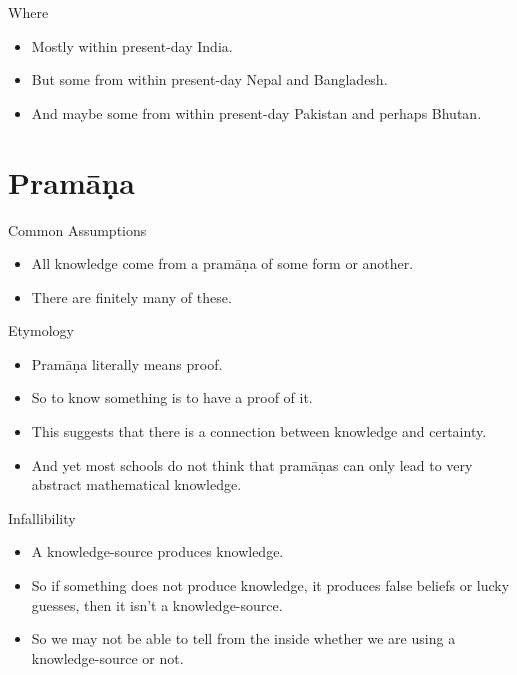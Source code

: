 \documentclass[
  17pt,
  letterpaper,
  ignorenonframetext,
  aspectratio=169,
  handout]{beamer}
\providecommand{\tightlist}{%
  \setlength{\itemsep}{0pt}\setlength{\parskip}{0pt}}\usepackage{longtable,booktabs,array}
\begin{document}
\begin{frame}{Where}
\protect\hypertarget{where-1}{}
\begin{itemize}[<+->]
\tightlist
\item
  Mostly within present-day India.
\item
  But some from within present-day Nepal and Bangladesh.
\item
  And maybe some from within present-day Pakistan and perhaps Bhutan.
\end{itemize}
\end{frame}

\hypertarget{pramux101ux1e47a}{%
\section{Pramāṇa}\label{pramux101ux1e47a}}

\begin{frame}{Common Assumptions}
\protect\hypertarget{common-assumptions}{}
\begin{itemize}[<+->]
\tightlist
\item
  All knowledge come from a pramāṇa of some form or another.
\item
  There are finitely many of these.
\end{itemize}
\end{frame}

\begin{frame}{Etymology}
\protect\hypertarget{etymology}{}
\begin{itemize}[<+->]
\tightlist
\item
  Pramāṇa literally means proof.
\item
  So to know something is to have a proof of it.
\item
  This suggests that there is a connection between knowledge and
  certainty.
\item
  And yet most schools do not think that pramāṇas can only lead to very
  abstract mathematical knowledge.
\end{itemize}
\end{frame}

\begin{frame}{Infallibility}
\protect\hypertarget{infallibility}{}
\begin{itemize}[<+->]
\tightlist
\item
  A knowledge-source produces knowledge.
\item
  So if something does not produce knowledge, it produces false beliefs
  or lucky guesses, then it isn't a knowledge-source.
\item
  So we may not be able to tell from the inside whether we are using a
  knowledge-source or not.
\end{itemize}
\end{frame}
\end{document}
